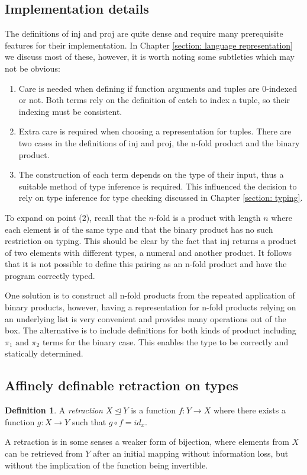 \documentclass[12pt,a4paper]{report}
\theoremstyle{definition}
\newtheorem{definition}{Definition}[chapter]%
\theoremstyle{remark}
\begin{document}
\subsection{Implementation details}
The definitions of inj and proj are quite dense and require many prerequisite features for their implementation. In Chapter \ref{section: language representation} we discuss most of these, however, it is worth noting some subtleties which may not be obvious:
\begin{enumerate}
    \item Care is needed when defining if function arguments and tuples are 0-indexed or not. Both terms rely on the definition of catch to index a tuple, so their indexing must be consistent.
    \item Extra care is required when choosing a representation for tuples. There are two cases in the definitions of inj and proj, the n-fold product and the binary product. 
    \item The construction of each term depends on the type of their input, thus a suitable method of type inference is required. This influenced the decision to rely on type inference for type checking discussed in Chapter \ref{section: typing}.
\end{enumerate}

To expand on point (2), recall that the $n$-fold is a product with length $n$ where each element is of the same type and that the binary product has no such restriction on typing. This should be clear by the fact that inj returns a product of two elements with different types, a numeral and another product. It follows that it is not possible to define this pairing as an n-fold product and have the program correctly typed.

One solution is to construct all n-fold products from the repeated application of binary products, however, having a representation for n-fold products relying on an underlying list is very convenient and provides many operations out of the box. The alternative is to include definitions for both kinds of product including $\pi_1 \text{ and } \pi_2$ terms for the binary case. This enables the type to be correctly and statically determined. 

\subsection{Affinely definable retraction on types}
\begin{definition}
    A \emph{retraction} $X \trianglelefteq Y$ is a function $f: Y \rightarrow X$ where there exists a function $g: X \rightarrow Y$ such that $g \circ f = id_x$. 
    
    A retraction is in some senses a weaker form of bijection, where elements from $X$ can be retrieved from $Y$ after an initial mapping without information loss, but without the implication of the function being invertible.
\end{definition}
\end{document}
